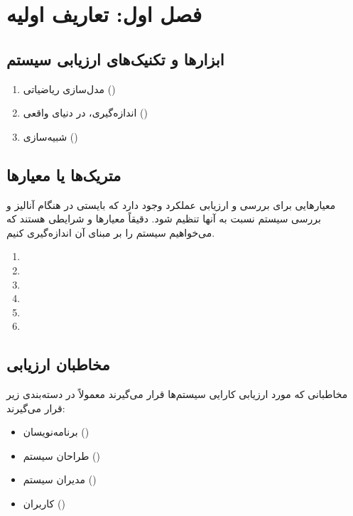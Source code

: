 \section{فصل اول: تعاریف اولیه}

\subsection{ابزار‌ها و تکنیک‌های ارزیابی سیستم}

\begin{enumerate}
    \item مدل‌سازی ریاضیاتی ()
    \item اندازه‌گیری، در دنیای واقعی ()
    \item شبیه‌سازی ()
\end{enumerate}

\subsection{متریک‌ها یا معیار‌ها}

 معیار‌هایی برای بررسی و ارزیابی عملکرد وجود دارد که بایستی در هنگام آنالیز و
 بررسی سیستم نسبت به آنها تنظیم شود. دقیقاً معیار‌ها و شرایطی هستند که می‌خواهیم
 سیستم را بر مبنای آن اندازه‌گیری کنیم.

\begin{enumerate}
    \item {}
    \item {}
    \item {}
    \item {}
    \item {}
    \item {}
\end{enumerate}

\subsection{مخاطبان ارزیابی}

مخاطبانی که مورد ارزیابی کارایی سیستم‌ها قرار می‌گیرند معمولاً در دسته‌بندی زیر
قرار می‌گیرند:

\begin{itemize}
    \item برنامه‌نویسان ()
    \item طراحان سیستم ()
    \item مدیران سیستم ()
    \item کاربران ()
\end{itemize}

